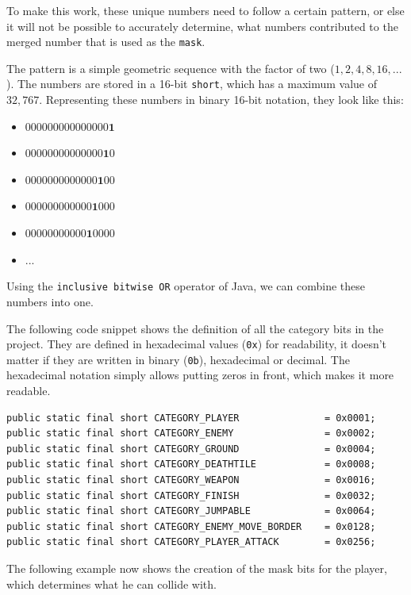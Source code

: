 \documentclass[12p]{article}
\begin{document}
To make this work, these unique numbers need to follow a certain pattern, or else it will not be possible to accurately determine, what numbers contributed to the merged number that is used as the \texttt{mask}.

The pattern is a simple geometric sequence with the factor of two ($1, 2, 4, 8, 16, ...$). The numbers are stored in a 16-bit \texttt{short}, which has a maximum value of $32,767$. Representing these numbers in binary 16-bit notation, they look like this:

\begin{itemize}[leftmargin=*]
    \itemsep-0.75em 
    \item[] $000000000000000\mathbf{1}$
    \item[] $00000000000000\mathbf{1}0$
    \item[] $0000000000000\mathbf{1}00$
    \item[] $000000000000\mathbf{1}000$
    \item[] $00000000000\mathbf{1}0000$
    \item[] $...$
\end{itemize}

Using the \texttt{inclusive bitwise OR} operator \cite{bitwiseOROperator} of Java, we can combine these numbers into one.

The following code snippet shows the definition of all the category bits in the project. They are defined in hexadecimal values (\texttt{0x}) for readability, it doesn't matter if they are written in binary (\texttt{0b}), hexadecimal or decimal. The hexadecimal notation simply allows putting zeros in front, which makes it more readable.

\begin{verbatim}
public static final short CATEGORY_PLAYER               = 0x0001;
public static final short CATEGORY_ENEMY                = 0x0002;
public static final short CATEGORY_GROUND               = 0x0004;
public static final short CATEGORY_DEATHTILE            = 0x0008;
public static final short CATEGORY_WEAPON               = 0x0016;
public static final short CATEGORY_FINISH               = 0x0032;
public static final short CATEGORY_JUMPABLE             = 0x0064;
public static final short CATEGORY_ENEMY_MOVE_BORDER    = 0x0128;
public static final short CATEGORY_PLAYER_ATTACK        = 0x0256;
\end{verbatim}

The following example now shows the creation of the mask bits for the player, which determines what he can collide with.
\end{document}
